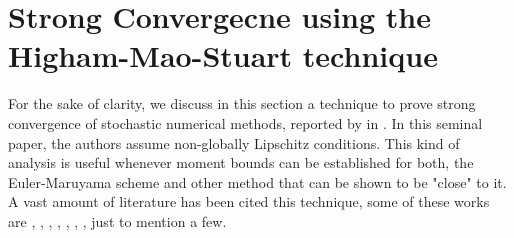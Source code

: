 \documentclass[sort&compress, preprint]{elsarticle}
\theoremstyle{definition}
\theoremstyle{plain}%
\theoremstyle{remark}
\begin{document}
\section{Strong Convergecne using the Higham-Mao-Stuart technique} 

	For the sake of clarity,  we discuss in this section a technique to prove strong convergence of stochastic
numerical methods, reported  by  \citeauthor*{Higham2002b} in \cite{Higham2002b}.
In this seminal paper, the authors assume non-globally Lipschitz conditions.
This kind of analysis is useful whenever moment bounds can be established for both, the Euler-Maruyama scheme and 
other method that can be shown to be "close" to it. A vast amount of literature has been cited this 
technique, some of these works are
\cite{Beyn2010}, 
\cite{Guo2014}, 
\cite{Hutzenthaler2015}, 
\cite{Hutzenthaler2012a}, 
\cite{Hutzenthaler2010}
\cite{Lamba2007}, 
\cite{Mao2013}, 
\cite{Tretyakov2013}, 
just to mention a few.
\end{document}
